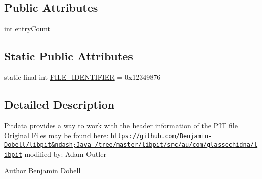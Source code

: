 \subsection*{Public Attributes}
\begin{DoxyCompactItemize}
\item 
int \hyperlink{classCASUAL_1_1archiving_1_1libpit_1_1PitData_ab41fe7d1fd169ddedbee537de1c05e13}{entry\-Count}
\end{DoxyCompactItemize}
\subsection*{Static Public Attributes}
\begin{DoxyCompactItemize}
\item 
static final int \hyperlink{classCASUAL_1_1archiving_1_1libpit_1_1PitData_af97b674d87621267c191e126292e4d3b}{F\-I\-L\-E\-\_\-\-I\-D\-E\-N\-T\-I\-F\-I\-E\-R} = 0x12349876
\end{DoxyCompactItemize}


\subsection{Detailed Description}
Pitdata provides a way to work with the header information of the P\-I\-T file Original Files may be found here\-: \href{https://github.com/Benjamin-Dobell/libpit&ndash;Java-/tree/master/libpit/src/au/com/glassechidna/libpit}{\tt https\-://github.\-com/\-Benjamin-\/\-Dobell/libpit\&ndash;\-Java-\//tree/master/libpit/src/au/com/glassechidna/libpit} modified by\-: Adam Outler

\begin{DoxyAuthor}{Author}
Benjamin Dobell 
\end{DoxyAuthor}


